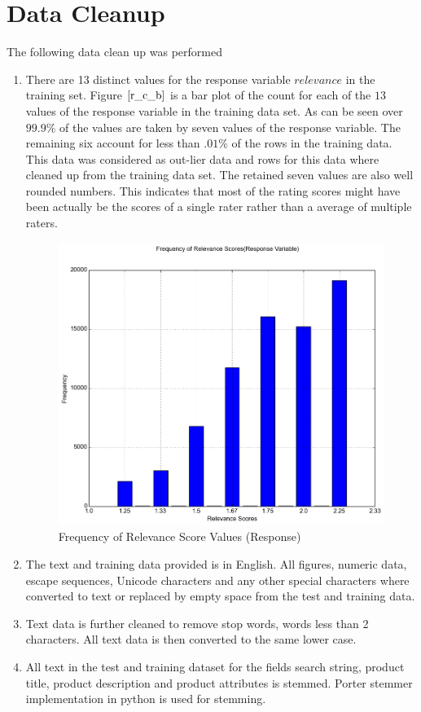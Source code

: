 \documentclass[twoside,12pt]{article}
\begin{document}
\section{Data Cleanup}
\label{cleanup}
The following data clean up was performed
\begin{enumerate}
	\item
	There are 13 distinct values for the response variable $relevance$ in the training set. Figure $\eqref{r_c_b}$ is a bar plot of the count for each of the $13$ values of the response variable in the training data set. As can be seen over $99.9\%$ of the values are taken by seven values of the response variable. The remaining six account for less than $.01\%$ of the rows in the training data. This data was considered as out-lier data and rows for this data where cleaned up from the training data set. The retained seven values are also well rounded numbers. This indicates that most of the rating scores might have been actually be the scores of a single rater rather than a average of multiple raters.
	\FloatBarrier
	\begin{figure}[!htbp]
		\centering
		\includegraphics[scale=.43]{DataVisualization/relv_plot.png} 
		\caption{Frequency of Relevance Score Values (Response) }
		\label{r_c_b}
	\end{figure}
	\item
	The text and training data provided is in English. All figures, numeric data, escape sequences, Unicode characters and any other special characters where converted to text or replaced by empty space from the test and training data.   
	\item
	Text data is further cleaned to remove stop words, words less than 2 characters. All text data is then converted to the same lower case.
	\item
	All text in  the test and training dataset for the fields search string, product title, product description and product attributes is stemmed. Porter stemmer implementation in python is used for stemming.
\end{enumerate}
\end{document}
